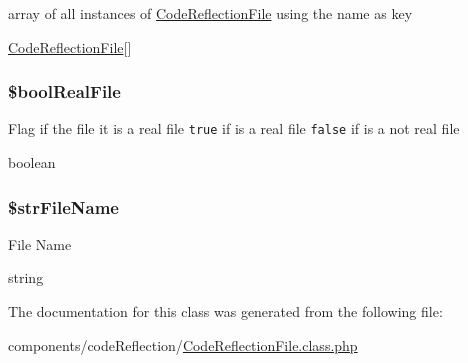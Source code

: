 array of all instances of \hyperlink{class_code_reflection_file}{CodeReflectionFile} using the name as key

\hyperlink{class_code_reflection_file}{CodeReflectionFile}\mbox{[}\mbox{]} \hypertarget{class_code_reflection_file_bf37456404912df1c2bd416e9a3b3adc}{
\subsubsection[{\$boolRealFile}]{\setlength{\rightskip}{0pt plus 5cm}\$boolRealFile}}
\label{class_code_reflection_file_bf37456404912df1c2bd416e9a3b3adc}


Flag if the file it is a real file {\tt true} if is a real file {\tt false} if is a not real file

boolean \hypertarget{class_code_reflection_file_f2f34642a0d84201c7dc5604c26a5f87}{
\subsubsection[{\$strFileName}]{\setlength{\rightskip}{0pt plus 5cm}\$strFileName}}
\label{class_code_reflection_file_f2f34642a0d84201c7dc5604c26a5f87}


File Name

string 

The documentation for this class was generated from the following file:\begin{CompactItemize}
\item 
components/codeReflection/\hyperlink{_code_reflection_file_8class_8php}{CodeReflectionFile.class.php}\end{CompactItemize}
